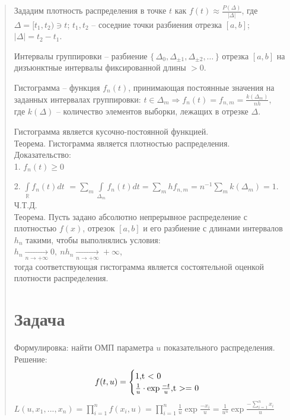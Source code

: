 \documentclass{article}
\begin{document}
\begin{quote}
Зададим плотность распределения в точке $t$ как
$f(t) \approx \frac{P(\Delta)}{|\Delta|}$, где
$\Delta = [t_1, t_2) \ni t$;
$t_1, t_2$ -- соседние точки разбиения отрезка $[a, b]$;
$|\Delta| = t_2 - t_1$.

Интервалы группировки -- разбиение
$\{\,\Delta_0, \Delta_{\pm 1}, \Delta_{\pm 2}, \ldots\,\}$ отрезка
$[a, b]$ на дизъюнктные интервалы фиксированной длины $> 0$.

Гистограмма -- функция $f_n(t)$, принимающая постоянные значения на заданных интервалах группировки:
$t \in \Delta_m \Longrightarrow f_{n}(t) = f_{n, m} = \frac{k(\Delta_m)}{nh}$,\\
где $k(\Delta)$ -- количество элементов выборки, лежащих в отрезке $\Delta$.

Гистограмма является кусочно-постоянной функцией.\\

Теорема. Гистограмма является плотностью распределения.\\
Доказательство:\\
1. $f_n(t) \geqslant 0$

2. $\int\limits_{\mathbb{R}}{f_n(t) dt}$
$= \sum_{m}{\int\limits_{\Delta_m}{f_{n}(t) dt}} =
        \sum_{m}{h f_{n, m}} = n^{-1} \sum_m{k(\Delta_m)} = 1$.
\\ Ч.Т.Д. \\

Теорема. Пусть задано абсолютно непрерывное распределение с плотностью $f(x)$,
отрезок $[a, b]$ и его разбиение с длинами интервалов $h_n$ такими,
чтобы выполнялись условия:\\
$h_n \xrightarrow[n \to +\infty]{} 0,~ nh_n \xrightarrow[n \to +\infty]{} +\infty$, \\
тогда соответствующая гистограмма является состоятельной оценкой плотности распределения.
\section{Задача}
Формулировка: найти ОМП параметра $u$ показательного распределения. \\
Решение:
\begin{equation*}
f(t, u) = 
 \begin{cases}
   1, $t < 0$ \\
   \frac{1}{u} \cdot \exp{\frac{-t}{u}}, $t >= 0$
 \end{cases}
\end{equation*}
$L(u, x_1, ..., x_n) = \prod_{i = 1}^n{f(x_i, u)} = \prod_{i = 1}^n{\frac{1}{u}\exp{\frac{-x_i}{u}}} =
  \frac{1}{u^n}\exp{\frac{-\sum_{i = 1}^{n}{x_i}}{u}}$


\end{quote}
\end{document}
